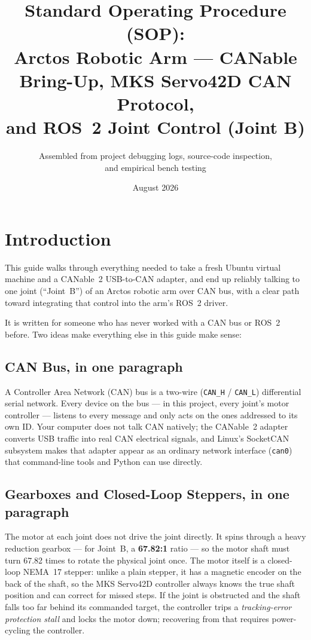 \documentclass[11pt,letterpaper]{article}
\title{Standard Operating Procedure (SOP): \\ Arctos Robotic Arm --- CANable Bring-Up, MKS Servo42D CAN Protocol, \\ and ROS~2 Joint Control (Joint B)}
\author{Assembled from project debugging logs, source-code inspection, \\ and empirical bench testing}
\date{August 2026}
\begin{document}
\maketitle
\tableofcontents
\newpage

\section{Introduction}

This guide walks through everything needed to take a fresh Ubuntu virtual machine and a CANable~2 USB-to-CAN adapter, and end up reliably talking to one joint (``Joint~B'') of an Arctos robotic arm over CAN bus, with a clear path toward integrating that control into the arm's ROS~2 driver.

It is written for someone who has never worked with a CAN bus or ROS~2 before. Two ideas make everything else in this guide make sense:

\subsection{CAN Bus, in one paragraph}
A Controller Area Network (CAN) bus is a two-wire (\texttt{CAN\_H} / \texttt{CAN\_L}) differential serial network. Every device on the bus --- in this project, every joint's motor controller --- listens to every message and only acts on the ones addressed to its own ID. Your computer does not talk CAN natively; the CANable~2 adapter converts USB traffic into real CAN electrical signals, and Linux's SocketCAN subsystem makes that adapter appear as an ordinary network interface (\texttt{can0}) that command-line tools and Python can use directly.

\subsection{Gearboxes and Closed-Loop Steppers, in one paragraph}
The motor at each joint does not drive the joint directly. It spins through a heavy reduction gearbox --- for Joint~B, a \textbf{67.82:1} ratio --- so the motor shaft must turn 67.82 times to rotate the physical joint once. The motor itself is a closed-loop NEMA~17 stepper: unlike a plain stepper, it has a magnetic encoder on the back of the shaft, so the MKS Servo42D controller always knows the true shaft position and can correct for missed steps. If the joint is obstructed and the shaft falls too far behind its commanded target, the controller trips a \emph{tracking-error protection stall} and locks the motor down; recovering from that requires power-cycling the controller.
\end{document}

